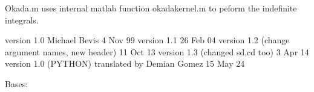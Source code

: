 \documentclass[letterpaper,10pt,english]{sphinxmanual}
\begin{document}
\sphinxAtStartPar
Okada.m uses internal matlab function okadakernel.m to peform the indefinite integrals.

\sphinxAtStartPar
version 1.0               Michael Bevis                  4 Nov 99
version 1.1                                             26 Feb 04
version 1.2  (change argument names, new header)        11 Oct 13
version 1.3  (changed sd,cd too)                         3 Apr 14
version 1.0  (PYTHON) translated by Demian Gomez        15 May 24

\begin{fulllineitems}
\label{\detokenize{classes:classes.pyOkada.Score}}
\pysigstartsignatures
{}
\pysigstopsignatures
\sphinxAtStartPar
Bases: 

\begin{fulllineitems}
\label{\detokenize{classes:classes.pyOkada.Score.compute_disp_field}}
\pysigstartsignatures
{}
\pysigstopsignatures
\end{fulllineitems}


\begin{fulllineitems}
\label{\detokenize{classes:classes.pyOkada.Score.save_mask}}
\pysigstartsignatures
{}
\pysigstopsignatures
\end{fulllineitems}


\end{fulllineitems}
\end{document}
